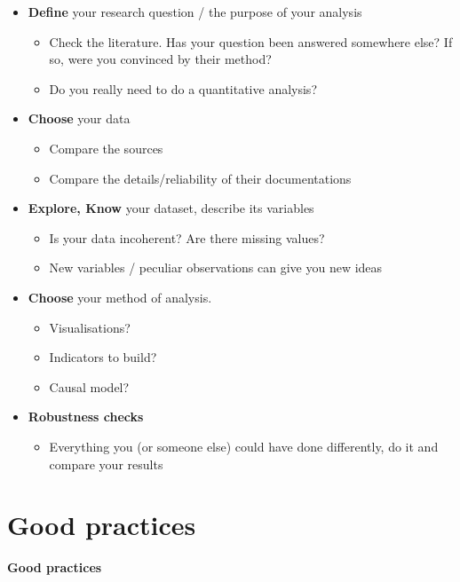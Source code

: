 \documentclass{beamer}
\begin{document}
\begin{frame}
    \begin{itemize}
        \item \textbf{Define} your research question / the purpose of your analysis
        \begin{itemize}
            \item Check the literature. Has your question been answered somewhere else? If so, were you convinced by their method?
            \item Do you really need to do a quantitative analysis?
        \end{itemize}
        \item \textbf{Choose} your data
        \begin{itemize}
            \item Compare the sources
            \item Compare the details/reliability of their documentations
        \end{itemize}
        \item \textbf{Explore, Know} your dataset, describe its variables
        \begin{itemize}
            \item Is your data incoherent? Are there missing values?
            \item New variables / peculiar observations can give you new ideas
        \end{itemize}
        \item \textbf{Choose} your method of analysis.
        \begin{itemize}
            \item Visualisations? 
            \item Indicators to build?
            \item Causal model?
        \end{itemize}
        \item \textbf{Robustness checks}
        \begin{itemize}
            \item Everything you (or someone else) could have done differently, do it and compare your results
        \end{itemize}
    \end{itemize}
\end{frame}

\section{Good practices}
\begin{frame}[plain]
    \centering \Large
    \textbf{Good practices}
\end{frame}
\end{document}
